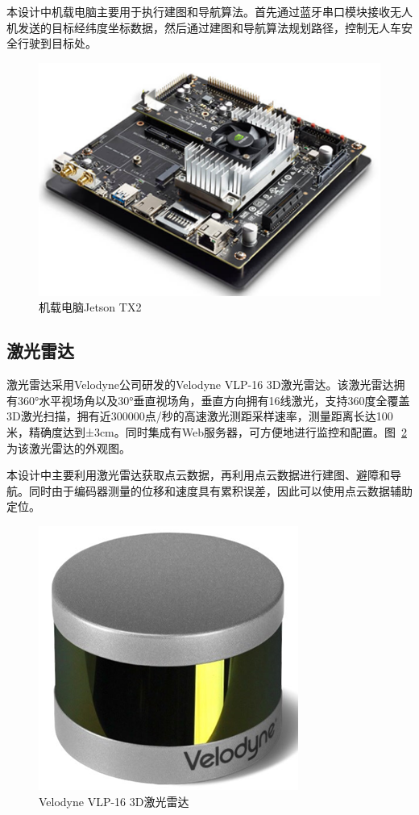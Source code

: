 本设计中机载电脑主要用于执行建图和导航算法。首先通过蓝牙串口模块接收无人机发送的目标经纬度坐标数据，然后通过建图和导航算法规划路径，控制无人车安全行驶到目标处。

\clearpage
\begin{figure}[htb]
	\centering
	\includegraphics[width=0.6\linewidth]{figures/3-4.png}
	\caption{机载电脑Jetson TX2}
	\label{fig:3-4}
\end{figure}

\subsection{激光雷达}
激光雷达采用Velodyne公司研发的Velodyne VLP-16 3D激光雷达。该激光雷达拥有360°水平视场角以及30°垂直视场角，垂直方向拥有16线激光，支持360度全覆盖3D激光扫描，拥有近300000点/秒的高速激光测距采样速率，测量距离长达100米，精确度达到±3cm。同时集成有Web服务器，可方便地进行监控和配置。图~\ref{fig:3-5}为该激光雷达的外观图。

本设计中主要利用激光雷达获取点云数据，再利用点云数据进行建图、避障和导航。同时由于编码器测量的位移和速度具有累积误差，因此可以使用点云数据辅助定位。

\begin{figure}[htb]
	\centering
	\includegraphics[width=0.5\linewidth]{figures/3-5.png}
	\caption{Velodyne VLP-16 3D激光雷达}
	\label{fig:3-5}
\end{figure}

